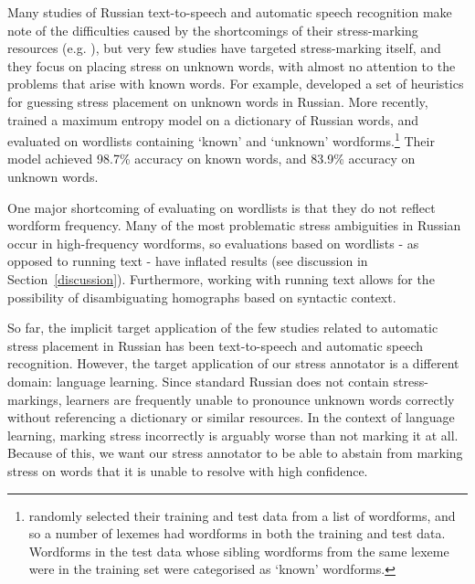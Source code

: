 \documentclass[11pt]{article}
\begin{document}
Many studies of Russian text-to-speech and automatic speech recognition make note of the 
difficulties caused by the shortcomings of their stress-marking resources (e.g. 
), but very few studies have targeted stress-marking 
itself, and they focus on placing stress on unknown words, with almost no 
attention to the problems that arise with known words. For example, 
 developed a set of heuristics for guessing stress 
placement on unknown words in Russian. More recently, 
 trained a maximum entropy model on a 
dictionary of Russian words, and evaluated on wordlists containing `known' and 
`unknown' wordforms.\footnote{ randomly 
selected their training and test data from a list of wordforms, and so a number 
of lexemes had wordforms in both the training and test data. Wordforms in the 
test data whose sibling wordforms from the same lexeme were in the training set 
were categorised as `known' wordforms.} Their model achieved 98.7\% accuracy on 
known words, and 83.9\% accuracy on unknown words. 

One major shortcoming of evaluating on wordlists is that they do not reflect 
wordform frequency.
Many of the most problematic stress ambiguities in Russian occur in 
high-frequency wordforms, so evaluations based on wordlists - as opposed to 
running text - have inflated results (see discussion in 
Section~\ref{discussion}). Furthermore, working with running text allows for the
possibility of disambiguating homographs based on syntactic context.

So far, the implicit target application of the few studies related to automatic 
stress placement in Russian has been text-to-speech and automatic speech 
recognition. However, the target application of our stress
annotator is a different domain: language learning. Since standard Russian does 
not contain stress-markings, learners are frequently unable to pronounce unknown 
words correctly without referencing a dictionary or similar resources. In the 
context of language learning, marking stress incorrectly is arguably worse than 
not marking it at all. Because of this, we want our stress annotator to be able 
to abstain from marking stress on words that it is unable to resolve with high 
confidence.
\end{document}
